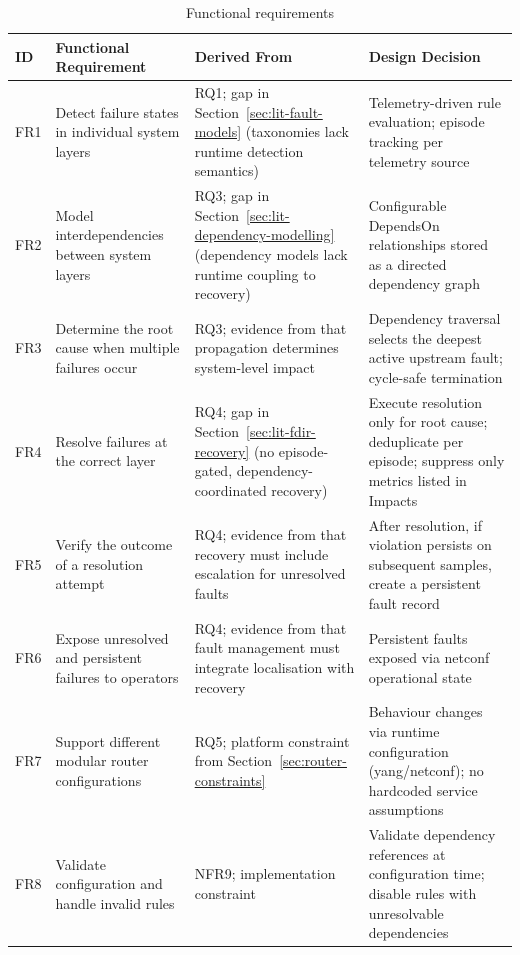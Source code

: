 \begin{table}[htbp]
\centering
\caption{Functional requirements}
\label{tab:functional-requirements}
\begin{tabular}{p{1.2cm} p{4.2cm} p{4.8cm} p{5.2cm}}
\toprule
ID & Functional Requirement & Derived From & Design Decision \\
\midrule
FR1 & Detect failure states in individual system layers & RQ1; gap in Section~\ref{sec:lit-fault-models} (taxonomies lack runtime detection semantics) & Telemetry-driven rule evaluation; episode tracking per telemetry source \\
FR2 & Model interdependencies between system layers & RQ3; gap in Section~\ref{sec:lit-dependency-modelling} (dependency models lack runtime coupling to recovery) & Configurable DependsOn relationships stored as a directed dependency graph \\
FR3 & Determine the root cause when multiple failures occur & RQ3; evidence from \cite{ref7,ref8,ref9} that propagation determines system-level impact & Dependency traversal selects the deepest active upstream fault; cycle-safe termination \\
FR4 & Resolve failures at the correct layer & RQ4; gap in Section~\ref{sec:lit-fdir-recovery} (no episode-gated, dependency-coordinated recovery) & Execute resolution only for root cause; deduplicate per episode; suppress only metrics listed in Impacts \\
FR5 & Verify the outcome of a resolution attempt & RQ4; evidence from \cite{ref2} that recovery must include escalation for unresolved faults & After resolution, if violation persists on subsequent samples, create a persistent fault record \\
FR6 & Expose unresolved and persistent failures to operators & RQ4; evidence from \cite{ref5} that fault management must integrate localisation with recovery & Persistent faults exposed via \gls{netconf} operational state \\
FR7 & Support different modular router configurations & RQ5; platform constraint from Section~\ref{sec:router-constraints} & Behaviour changes via runtime configuration (\gls{yang}/\gls{netconf}); no hardcoded service assumptions \\
FR8 & Validate configuration and handle invalid rules & NFR9; implementation constraint & Validate dependency references at configuration time; disable rules with unresolvable dependencies \\
\bottomrule
\end{tabular}
\end{table}

